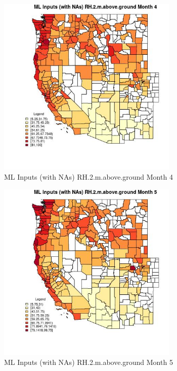 \begin{figure} 
\centering  
\includegraphics[width=0.77\textwidth]{Code_Outputs/Report_ML_input_PM25_Step4_part_f_de_duplicated_aves_prioritize_24hr_obswNAs_CountyRH2mabovegroundmedianMonth4.jpg} 
\caption{\label{fig:Report_ML_input_PM25_Step4_part_f_de_duplicated_aves_prioritize_24hr_obswNAsCountyRH2mabovegroundmedianMonth4}ML Inputs (with NAs) RH.2.m.above.ground Month 4} 
\end{figure} 
 

\begin{figure} 
\centering  
\includegraphics[width=0.77\textwidth]{Code_Outputs/Report_ML_input_PM25_Step4_part_f_de_duplicated_aves_prioritize_24hr_obswNAs_CountyRH2mabovegroundmedianMonth5.jpg} 
\caption{\label{fig:Report_ML_input_PM25_Step4_part_f_de_duplicated_aves_prioritize_24hr_obswNAsCountyRH2mabovegroundmedianMonth5}ML Inputs (with NAs) RH.2.m.above.ground Month 5} 
\end{figure} 
 

